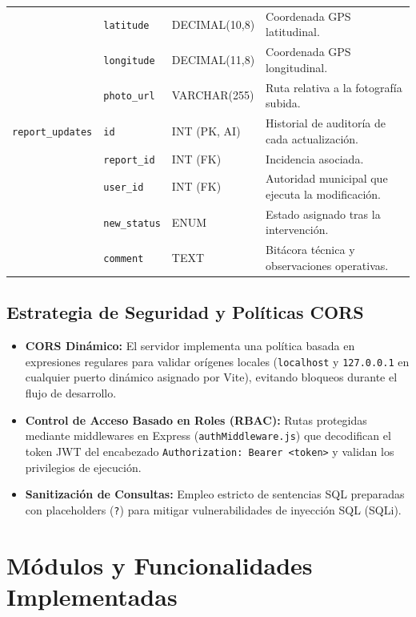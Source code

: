 \documentclass[12pt,a4paper]{article}
\begin{document}
\begin{table}[H]
\begin{tabular}{lllp{6.5cm}}
 & \texttt{latitude} & DECIMAL(10,8) & Coordenada GPS latitudinal. \\
 & \texttt{longitude} & DECIMAL(11,8) & Coordenada GPS longitudinal. \\
 & \texttt{photo\_url} & VARCHAR(255) & Ruta relativa a la fotografía subida. \\
\midrule
\texttt{report\_updates} & \texttt{id} & INT (PK, AI) & Historial de auditoría de cada actualización. \\
 & \texttt{report\_id} & INT (FK) & Incidencia asociada. \\
 & \texttt{user\_id} & INT (FK) & Autoridad municipal que ejecuta la modificación. \\
 & \texttt{new\_status} & ENUM & Estado asignado tras la intervención. \\
 & \texttt{comment} & TEXT & Bitácora técnica y observaciones operativas. \\
\bottomrule
\end{tabular}
\end{table}

\subsection{Estrategia de Seguridad y Políticas CORS}
\begin{itemize}[leftmargin=*]
    \item \textbf{CORS Dinámico:} El servidor implementa una política basada en expresiones regulares para validar orígenes locales (\texttt{localhost} y \texttt{127.0.0.1} en cualquier puerto dinámico asignado por Vite), evitando bloqueos durante el flujo de desarrollo.
    \item \textbf{Control de Acceso Basado en Roles (RBAC):} Rutas protegidas mediante middlewares en Express (\texttt{authMiddleware.js}) que decodifican el token JWT del encabezado \texttt{Authorization: Bearer <token>} y validan los privilegios de ejecución.
    \item \textbf{Sanitización de Consultas:} Empleo estricto de sentencias SQL preparadas con placeholders (\texttt{?}) para mitigar vulnerabilidades de inyección SQL (SQLi).
\end{itemize}

\section{Módulos y Funcionalidades Implementadas}
\end{document}
